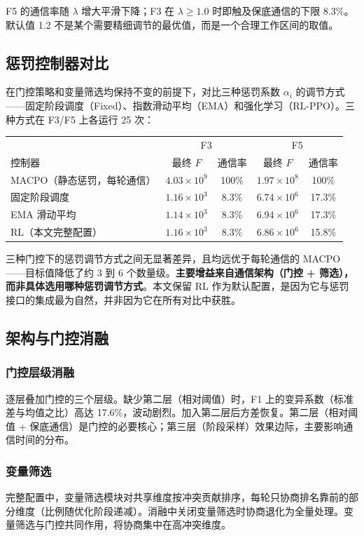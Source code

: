 \documentclass[11pt,a4paper]{ctexart}
\begin{document}
F5 的通信率随 $\lambda$ 增大平滑下降；F3 在 $\lambda \ge 1.0$ 时即触及保底通信的下限 8.3\%。默认值 1.2 不是某个需要精细调节的最优值，而是一个合理工作区间的取值。

\subsection{惩罚控制器对比}
在门控策略和变量筛选均保持不变的前提下，对比三种惩罚系数 $\alpha_i$ 的调节方式——固定阶段调度（Fixed）、指数滑动平均（EMA）和强化学习（RL-PPO）。三种方式在 F3/F5 上各运行 25 次：

\begin{center}\small
\begin{tabular}{@{}lcc|cc@{}}
\toprule
& \multicolumn{2}{c|}{F3} & \multicolumn{2}{c}{F5} \\
控制器 & 最终 $F$ & 通信率 & 最终 $F$ & 通信率 \\
\midrule
MACPO（静态惩罚，每轮通信） & $4.03\times10^9$ & 100\% & $1.97\times10^8$ & 100\% \\
固定阶段调度 & $1.16\times10^3$ & 8.3\% & $6.74\times10^6$ & 17.3\% \\
EMA 滑动平均 & $1.14\times10^3$ & 8.3\% & $6.94\times10^6$ & 17.3\% \\
RL（本文完整配置） & $1.16\times10^3$ & 8.3\% & $6.86\times10^6$ & 15.8\% \\
\bottomrule
\end{tabular}
\end{center}

三种门控下的惩罚调节方式之间无显著差异，且均远优于每轮通信的 MACPO——目标值降低了约 3 到 6 个数量级。\textbf{主要增益来自通信架构（门控 + 筛选），而非具体选用哪种惩罚调节方式}。本文保留 RL 作为默认配置，是因为它与惩罚接口的集成最为自然，并非因为它在所有对比中获胜。

\subsection{架构与门控消融}

\subsubsection{门控层级消融}
逐层叠加门控的三个层级。缺少第二层（相对阈值）时，F1 上的变异系数（标准差与均值之比）高达 17.6\%，波动剧烈。加入第二层后方差恢复。第二层（相对阈值 + 保底通信）是门控的必要核心；第三层（阶段采样）效果边际，主要影响通信时间的分布。

\subsubsection{变量筛选}
完整配置中，变量筛选模块对共享维度按冲突贡献排序，每轮只协商排名靠前的部分维度（比例随优化阶段递减）。消融中关闭变量筛选时协商退化为全量处理。变量筛选与门控共同作用，将协商集中在高冲突维度。
\end{document}
